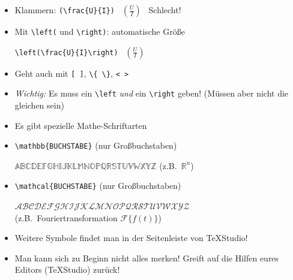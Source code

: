 \begin{frame}[<+->][fragile]
	\begin{itemize}
		\item Klammern: \lstinline!(\frac{U}{I})! \textrightarrow\ $\displaystyle(\frac{U}{I})$ \textrightarrow\ Schlecht!
		\item Mit \lstinline!\left(! und \lstinline!\right)!: automatische Größe
		
		\lstinline!\left(\frac{U}{I}\right)! \textrightarrow\ $\displaystyle\left(\frac{U}{I}\right)$
		\item Geht auch mit \lstinline![ ]!, \lstinline!\{ \}!, \lstinline!< >!
		\item \emph{Wichtig:} Es muss ein \lstinline!\left! \emph{und} ein \lstinline!\right! geben! (Müssen aber nicht die gleichen sein)
		\item Es gibt spezielle Mathe-Schriftarten
		\item \lstinline!\mathbb{BUCHSTABE}! (nur Großbuchstaben)
		
		$\mathbb{ABCDEFGHIJKLMNOPQRSTUVWXYZ}$ (z.B.\ $\mathbb{R}^n$)
		\item \lstinline!\mathcal{BUCHSTABE}! (nur Großbuchstaben)
		
		$\mathcal{ABCDEFGHIJKLMNOPQRSTUVWXYZ}$\\
		(z.B.\ Fouriertransformation $\mathcal{F}\{f(t)\}$)
		
		\item Weitere Symbole findet man in der Seitenleiste von TeXStudio!
		\item Man kann sich zu Beginn nicht alles merken! Greift auf die Hilfen eures Editors (TeXStudio) zurück!
	\end{itemize}
\end{frame}

